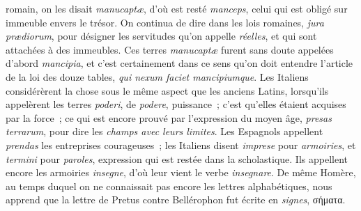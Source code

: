 \documentclass[french,twoside]{book} %
\begin{document}
romain, on les disait {\itshape manucaptæ}, d’où est resté {\itshape manceps}, celui qui est obligé sur immeuble envers le trésor. On continua de dire dans les lois romaines, {\itshape jura prædiorum}, pour désigner les servitudes qu’on appelle {\itshape réelles}, et qui sont attachées à des immeubles. Ces terres {\itshape manucaptæ} furent sans doute appelées d’abord {\itshape mancipia}, et c’est certainement dans ce sens qu’on doit entendre l’article de la loi des douze tables, \emph{{\itshape qui nexum faciet mancipiumque}}. Les Italiens considérèrent la chose sous le même aspect que les anciens Latins, lorsqu’ils appelèrent les terres {\itshape poderi}, de {\itshape podere}, puissance ; c’est qu’elles étaient acquises par la force ; ce qui est encore prouvé par l’expression du moyen âge, {\itshape presas terrarum}, pour dire les {\itshape champs avec leurs limites}. Les Espagnols appellent  {\itshape prendas} les entreprises courageuses ; les Italiens disent {\itshape imprese} pour {\itshape armoiries}, et {\itshape termini} pour {\itshape paroles}, expression qui est restée dans la scholastique. Ils appellent encore les armoiries {\itshape insegne}, d’où leur vient le verbe {\itshape insegnare}. De même Homère, au temps duquel on ne connaissait pas encore les lettres alphabétiques, nous apprend que la lettre de Pretus contre Bellérophon fut écrite en {\itshape signes}, σήματα.\par
\end{document}
